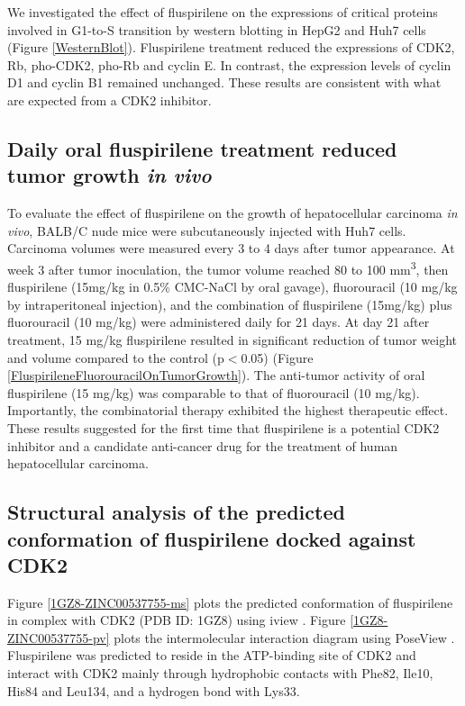 \documentclass[10pt]{article}
\begin{document}
We investigated the effect of fluspirilene on the expressions of critical proteins involved in G1-to-S transition by western blotting in HepG2 and Huh7 cells (Figure \ref{WesternBlot}). Fluspirilene treatment reduced the expressions of CDK2, Rb, pho-CDK2, pho-Rb and cyclin E. In contrast, the expression levels of cyclin D1 and cyclin B1 remained unchanged. These results are consistent with what are expected from a CDK2 inhibitor.

\subsection*{Daily oral fluspirilene treatment reduced tumor growth \textit{in vivo}}

To evaluate the effect of fluspirilene on the growth of hepatocellular carcinoma \textit{in vivo}, BALB/C nude mice were subcutaneously injected with Huh7 cells. Carcinoma volumes were measured every 3 to 4 days after tumor appearance. At week 3 after tumor inoculation, the tumor volume reached 80 to 100 mm\textsuperscript{3}, then fluspirilene (15mg/kg in 0.5\% CMC-NaCl by oral gavage), fluorouracil (10 mg/kg by intraperitoneal injection), and the combination of fluspirilene (15mg/kg) plus fluorouracil (10 mg/kg) were administered daily for 21 days. At day 21 after treatment, 15 mg/kg fluspirilene resulted in significant reduction of tumor weight and volume compared to the control (p$<$0.05) (Figure \ref{FluspirileneFluorouracilOnTumorGrowth}). The anti-tumor activity of oral fluspirilene (15 mg/kg) was comparable to that of fluorouracil (10 mg/kg). Importantly, the combinatorial therapy exhibited the highest therapeutic effect. These results suggested for the first time that fluspirilene is a potential CDK2 inhibitor and a candidate anti-cancer drug for the treatment of human hepatocellular carcinoma.

\subsection*{Structural analysis of the predicted conformation of fluspirilene docked against CDK2}

Figure \ref{1GZ8-ZINC00537755-ms} plots the predicted conformation of fluspirilene in complex with CDK2 (PDB ID: 1GZ8) using iview \cite{1366}. Figure \ref{1GZ8-ZINC00537755-pv} plots the intermolecular interaction diagram using PoseView \cite{748}. Fluspirilene was predicted to reside in the ATP-binding site of CDK2 and interact with CDK2 mainly through hydrophobic contacts with Phe82, Ile10, His84 and Leu134, and a hydrogen bond with Lys33.
\end{document}

